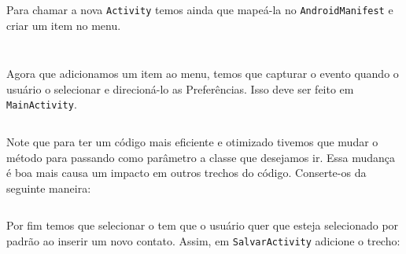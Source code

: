 Para chamar a nova \texttt{Activity} temos ainda que mapeá-la no \texttt{AndroidManifest} e criar
um item no menu.

\begin{listing}[H]
  \inputminted[linenos=true,frame=bottomline,tabsize=3]{ xml }{ source/AndroidManifest-4.xml }
  \caption{Mapeando Activity EditarPreferencias [AndroidManifest.xml]}
\end{listing}

\begin{listing}[H]
  \inputminted[linenos=true,frame=bottomline,tabsize=3]{ xml }{ source/main_menu-2.xml }
  \caption{Adicionar item Preferências ao menu principal [res/menu/main\b{ }menu.xml]}
\end{listing}

Agora que adicionamos um item ao menu, temos que capturar o evento quando o usuário o selecionar
e direcioná-lo as Preferências. Isso deve ser feito em \texttt{MainActivity}.

\begin{listing}[H]
  \inputminted[linenos=true,frame=bottomline,tabsize=3]{ java }{ source/MainActivity-12.java }
  \caption{Ir para Preferências pelo menu principal [MainActivity.java]}
\end{listing}

Note que para ter um código mais eficiente e otimizado tivemos que mudar o método 
para  passando como parâmetro a classe que desejamos ir. Essa mudança é boa mais causa
um impacto em outros trechos do código. Conserte-os da seguinte maneira:

\begin{listing}[H]
  \inputminted[linenos=true,frame=bottomline,tabsize=3]{ java }{ source/MainActivity-13.java }
  \caption{Mudança em método irParaSalvar [MainActivity.java]}
\end{listing}

Por fim temos que selecionar o tem que o usuário quer que esteja selecionado por padrão ao inserir
um novo contato. Assim, em \texttt{SalvarActivity} adicione o trecho:

\begin{listing}[H]
  \inputminted[linenos=true,frame=bottomline,tabsize=3]{ java }{ source/SalvarActivity-7.java }
  \caption{Obtem o valor padrão definido nas Preferências [SalvarActivity.java]}
\end{listing}

